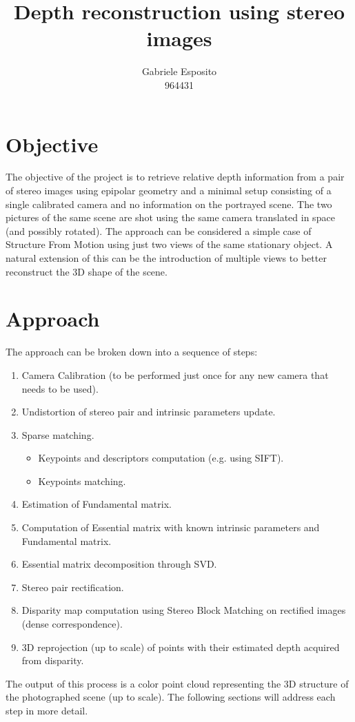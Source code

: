 \documentclass[12pt]{amsart}
\title{Depth reconstruction using stereo images}
\author{Gabriele Esposito\\964431}
\begin{document}
\setlength{\parskip}{0pt} %
\setlength{\parindent}{0pt}
\maketitle
\section*{Objective}
The objective of the project is to retrieve relative depth information from a pair of stereo images using epipolar geometry and a minimal setup consisting of a 
single calibrated camera and no information on the portrayed scene. 
The two pictures of the same scene are shot using the same camera translated in space (and possibly rotated). The approach can be considered a
simple case of Structure From Motion using just two views of the same stationary object. A natural extension of this can be the introduction of multiple views to better reconstruct 
the 3D shape of the scene.
\section*{Approach}
The approach can be broken down into a sequence of steps:
\begin{enumerate}[label={\arabic*.}]
    \item Camera Calibration (to be performed just once for any new camera that needs to be used).
    \item Undistortion of stereo pair and intrinsic parameters update.
    \item Sparse matching.
        \begin{itemize} 
            \item Keypoints and descriptors computation (e.g. using SIFT).
            \item Keypoints matching.
        \end{itemize}
    \item Estimation of Fundamental matrix.
    \item Computation of Essential matrix with known intrinsic parameters and Fundamental matrix.
    \item Essential matrix decomposition through SVD.
    \item Stereo pair rectification.
    \item Disparity map computation using Stereo Block Matching on rectified images (dense correspondence).
    \item 3D reprojection (up to scale) of points with their estimated depth acquired from disparity.
\end{enumerate}
The output of this process is a color point cloud representing the 3D structure of the photographed scene (up to scale).
The following sections will address each step in more detail.
\end{document}
